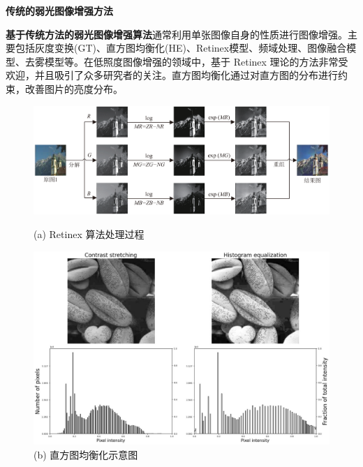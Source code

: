 \documentclass[CJK,aspectratio=169]{beamer}  %
\begin{document}
	\begin{frame}
		{ \yahei \textbf{传统的弱光图像增强方法}}
		
		{ \yahei \textbf{基于传统方法的弱光图像增强算法}通常利用单张图像自身的性质进行图像增强。主要包括灰度变换(GT)\textcolor{blue}{\citep{ueng1995gamma}}、直方图均衡化(HE)\textcolor{blue}{\citep{stark2000adaptive}}、Retinex模型\textcolor{blue}{\citep{land1971lightness}}、频域处理\textcolor{blue}{\citep{liu2021benchmarking}}、图像融合模型\textcolor{blue}{\citep{dai2019fractional}}、去雾模型\textcolor{blue}{\citep{ma2019improved}}等。在低照度图像增强的领域中，基于 Retinex 理论的方法非常受欢迎，并且吸引了众多研究者的关注。直方图均衡化通过对直方图的分布进行约束，改善图片的亮度分布。}
		
%		
%		
				
		\vspace{0.1cm}
		
		\begin{figure}
			\centering
			\begin{minipage}[t]{.45\columnwidth}
				\centering
				\includegraphics[width=\columnwidth]{picture/LLIE/Retinex Model/Retinex Model}
				\caption*{
					\label{fig: Retinex model} 
					\tiny (a) Retinex 算法处理过程
				}
			\end{minipage}
			\begin{minipage}[t]{.45\columnwidth}	
				\centering
				\includegraphics[width=0.82\columnwidth]{picture/LLIE/HE/Histogram equalization}
				\caption*{
					\label{fig: Histogram equalization} 
					\tiny (b) 直方图均衡化示意图
				}
			\end{minipage}
		\end{figure}
		

\end{frame}
\end{document}

